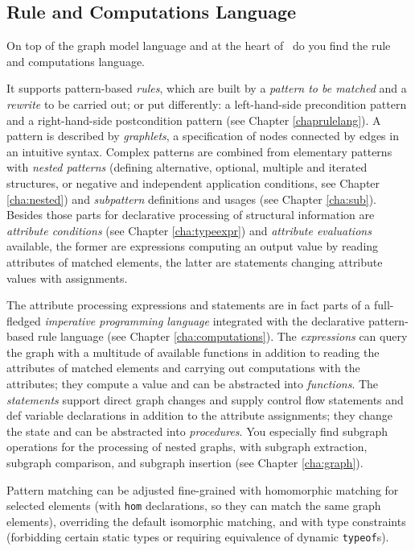 \subsection{Rule and Computations Language}
On top of the graph model language and at the heart of \GrG\ do you find the rule and computations language.

It supports pattern-based \emph{rules}, which are built by a \emph{pattern to be matched} and a \emph{rewrite} to be carried out; or put differently: a left-hand-side precondition pattern and a right-hand-side postcondition pattern (see Chapter \ref{chaprulelang}).
A pattern is described by \emph{graphlets}, a specification of nodes connected by edges in an intuitive syntax.
Complex patterns are combined from elementary patterns with \emph{nested patterns} (defining alternative, optional, multiple and iterated structures, or negative and independent application conditions, see Chapter \ref{cha:nested}) and \emph{subpattern} definitions and usages (see Chapter \ref{cha:sub}).
Besides those parts for declarative processing of structural information are \emph{attribute conditions} (see Chapter \ref{cha:typeexpr}) and \emph{attribute evaluations} available, the former are expressions computing an output value by reading attributes of matched elements, the latter are statements changing attribute values with assignments. 

The attribute processing expressions and statements are in fact parts of a full-fledged \emph{imperative programming language} integrated with the declarative pattern-based rule language (see Chapter \ref{cha:computations}).
The \emph{expressions} can query the graph with a multitude of available functions in addition to reading the attributes of matched elements and carrying out computations with the attributes; they compute a value and can be abstracted into \emph{functions}.
The \emph{statements} support direct graph changes and supply control flow statements and def variable declarations in addition to the attribute assignments; they change the state and can be abstracted into \emph{procedures}.
You especially find subgraph operations for the processing of nested graphs, with subgraph extraction, subgraph comparison, and subgraph insertion (see Chapter \ref{cha:graph}). 

Pattern matching can be adjusted fine-grained with homomorphic matching for selected elements (with \texttt{hom} declarations, so they can match the same graph elements), overriding the default isomorphic matching, and with type constraints (forbidding certain static types or requiring equivalence of dynamic \texttt{typeof}s).

